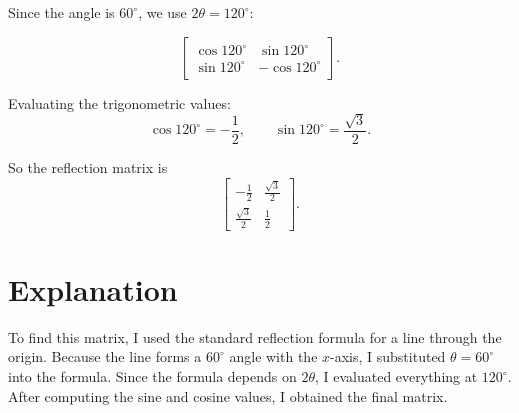 \documentclass{ximera}
\begin{document}
Since the angle is $60^\circ$, we use $2\theta = 120^\circ$:

\[
\begin{bmatrix}
\cos 120^\circ & \sin 120^\circ \\
\sin 120^\circ & -\cos 120^\circ
\end{bmatrix}.
\]

Evaluating the trigonometric values:
\[
\cos 120^\circ = -\frac{1}{2}, \qquad \sin 120^\circ = \frac{\sqrt{3}}{2}.
\]

So the reflection matrix is
\[
\begin{bmatrix}
-\frac{1}{2} & \frac{\sqrt{3}}{2} \\
\frac{\sqrt{3}}{2} & \frac{1}{2}
\end{bmatrix}.
\]

\section*{Explanation}

To find this matrix, I used the standard reflection formula for a line through the origin. Because the line forms a $60^\circ$ angle with the $x$-axis, I substituted $\theta = 60^\circ$ into the formula. Since the formula depends on $2\theta$, I evaluated everything at $120^\circ$. After computing the sine and cosine values, I obtained the final matrix.
\end{document}
